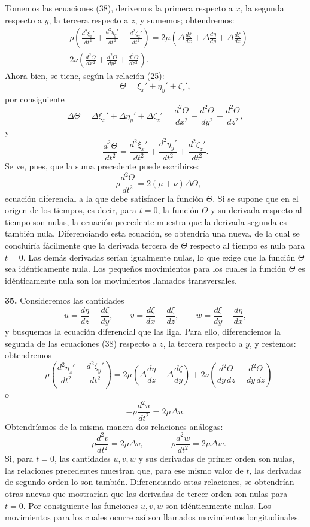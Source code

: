 Tomemos las ecuaciones (38), derivemos la primera respecto a $x$, la
segunda respecto a $y$, la tercera respecto a $z$, y sumemos; obtendremos:
\begin{multline*}
-\rho\left(\frac{d^2\xi_x'}{dt^2}+\frac{d^2\eta_y'}{dt^2}+\frac{d^2\zeta_z'}{dt^2}\right)
=2\mu\left(\Delta\frac{d\xi}{dx}+\Delta\frac{d\eta}{dy}+\Delta\frac{d\zeta}{dz}\right)\\
+2\nu\left(\frac{d^2\Theta}{dx^2}+\frac{d^2\Theta}{dy^2}+\frac{d^2\Theta}{dz^2}\right).
\end{multline*}
Ahora bien, se tiene, según la relación (25):
\[
\Theta=\xi_x'+\eta_y'+\zeta_z',
\]
por consiguiente
\[
\Delta\Theta=\Delta\xi_x'+\Delta\eta_y'+\Delta\zeta_z'
=\frac{d^2\Theta}{dx^2}+\frac{d^2\Theta}{dy^2}+\frac{d^2\Theta}{dz^2},
\]
y
\[
\frac{d^2\Theta}{dt^2}=\frac{d^2\xi_x'}{dt^2}+\frac{d^2\eta_y'}{dt^2}+\frac{d^2\zeta_z'}{dt^2}.
\]
Se ve, pues, que la suma precedente puede escribirse:
\[
-\rho\frac{d^2\Theta}{dt^2}=2(\mu+\nu)\Delta\Theta,
\]
ecuación diferencial a la que debe satisfacer la función $\Theta$. Si se
supone que en el origen de los tiempos, es decir, para $t=0$, la función
$\Theta$ y su derivada respecto al tiempo son nulas, la ecuación precedente
muestra que la derivada segunda es también nula. Diferenciando esta
ecuación, se obtendría una nueva, de la cual se concluiría fácilmente que
la derivada tercera de $\Theta$ respecto al tiempo es nula para $t=0$. Las
demás derivadas serían igualmente nulas, lo que exige que la función
$\Theta$ sea idénticamente nula. Los pequeños movimientos para los cuales
la función $\Theta$ es idénticamente nula son los movimientos llamados
transversales.

\noindent\textbf{35.} Consideremos las cantidades
\[
u=\frac{d\eta}{dz}-\frac{d\zeta}{dy},\qquad v=\frac{d\zeta}{dx}-\frac{d\xi}{dz},
\qquad w=\frac{d\xi}{dy}-\frac{d\eta}{dx},
\]
y busquemos la ecuación diferencial que las liga. Para ello, diferenciemos
la segunda de las ecuaciones (38) respecto a $z$, la tercera respecto a
$y$, y restemos: obtendremos
\[
-\rho\left(\frac{d^2\eta_z'}{dt^2}-\frac{d^2\zeta_y'}{dt^2}\right)
=2\mu\left(\Delta\frac{d\eta}{dz}-\Delta\frac{d\zeta}{dy}\right)
+2\nu\left(\frac{d^2\Theta}{dy\,dz}-\frac{d^2\Theta}{dy\,dz}\right)
\]
o
\[
-\rho\frac{d^2u}{dt^2}=2\mu\Delta u.
\]
Obtendríamos de la misma manera dos relaciones análogas:
\[
-\rho\frac{d^2v}{dt^2}=2\mu\Delta v,\qquad -\rho\frac{d^2w}{dt^2}=2\mu\Delta w.
\]
Si, para $t=0$, las cantidades $u,v,w$ y sus derivadas de primer orden son
nulas, las relaciones precedentes muestran que, para ese mismo valor de
$t$, las derivadas de segundo orden lo son también. Diferenciando estas
relaciones, se obtendrían otras nuevas que mostrarían que las derivadas de
tercer orden son nulas para $t=0$. Por consiguiente las funciones $u,v,w$
son idénticamente nulas. Los movimientos para los cuales ocurre así son
llamados movimientos longitudinales.

